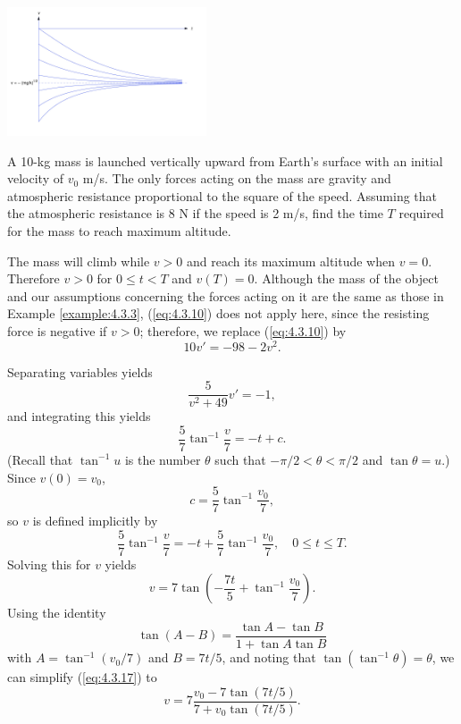 \documentclass{ximera}
\begin{document}
\begin{example}
\begin{explanation}
\begin{image}
  \includegraphics[height=1.5in]{fig040303.jpg}
\end{image}
\end{explanation}
\end{example}
 
\begin{example}\label{example:4.3.4}
A 10-kg mass is launched vertically upward from Earth's surface with
an initial velocity of $v_0$ m/s. The only forces acting on the mass
are gravity and atmospheric resistance proportional to the square of
the speed. Assuming that the atmospheric resistance is 8 N if the
speed is 2 m/s, find the time $T$ required for the mass to reach
maximum altitude.
 
 
\begin{explanation}  The mass will
climb while $v>0 $ and reach its maximum altitude when $v=0$.
Therefore $v>0$ for $0\leq t<T$ and $v(T)=0$. Although the mass of
the object and our assumptions concerning the forces acting on it are
the same as those in Example \ref{example:4.3.3},  (\ref{eq:4.3.10}) does
not apply here, since the resisting force is negative if $v>0$;
therefore, we replace (\ref{eq:4.3.10}) by
\begin{equation} \label{eq:4.3.15}
10v'=-98-2v^2.
\end{equation}
 
Separating variables  yields
$$
\frac{5}{v^2+49}v'=-1,
$$
 and integrating this yields
$$
\frac{5}{7}\tan^{-1}\frac{v}{7}=-t+c.
$$
 (Recall that $\tan^{-1}u$ is the number $\theta$
such that $-\pi/2 < \theta < \pi/2$ and $\tan \theta=u$.)
 Since $v(0)=v_0$,
$$
c=\frac{5}{7}\tan^{-1}\frac{v_0}{7},
$$
so $v$ is defined implicitly by
\begin{equation} \label{eq:4.3.16}
\frac{5}{7} \tan^{-1}\frac{v}{7}=-t+\frac{5}{7}
\tan^{-1}\frac{v_0}{7}, \quad 0\leq t\leq T.
\end{equation}
Solving this for $v$ yields
\begin{equation} \label{eq:4.3.17}
v=7\tan\left(-\frac{7t}{5}+\tan^{-1}\frac{v_0}{7}\right).
\end{equation}
Using the identity
$$
\tan(A-B)=\frac{\tan A-\tan B}{1+\tan A\tan B}
$$
with $A=\tan^{-1}(v_0/7)$ and $B=7t/5$, and noting that
$\tan(\tan^{-1}\theta)=\theta$,
we can simplify (\ref{eq:4.3.17}) to
$$
v=7\frac{v_0-7\tan(7t/5)}{7+v_0\tan(7t/5)}.
$$
 

\end{explanation}
\end{example}
\end{document}
